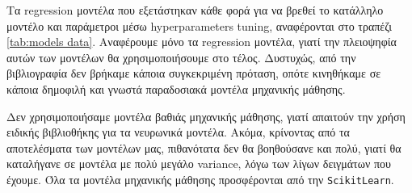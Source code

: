 Τα regression μοντέλα που εξετάστηκαν κάθε φορά για να βρεθεί το κατάλληλο μοντέλο και παράμετροι μέσω hyperparameters tuning, αναφέρονται στο τραπέζι \autoref{tab:models data}.
Αναφέρουμε μόνο τα regression μοντέλα, γιατί την πλειοψηφία αυτών των μοντέλων θα χρησιμοποιήσουμε στο τέλος.
Δυστυχώς, από την βιβλιογραφία δεν βρήκαμε κάποια συγκεκριμένη πρόταση, οπότε κινηθήκαμε σε κάποια δημοφιλή και γνωστά παραδοσιακά μοντέλα μηχανικής μάθησης.

Δεν χρησιμοποιήσαμε μοντέλα βαθιάς μηχανικής μάθησης, γιατί απαιτούν την χρήση ειδικής βιβλιοθήκης για τα νευρωνικά μοντέλα.
Ακόμα, κρίνοντας από τα αποτελέσματα των μοντέλων μας, πιθανότατα δεν θα βοηθούσανε και πολύ, γιατί θα καταλήγανε σε μοντέλα με πολύ μεγάλο variance, λόγω των λίγων δειγμάτων που έχουμε.
Όλα τα μοντέλα μηχανικής μάθησης προσφέρονται από την \texttt{Scikit\-Learn}.

\setlength{\tabcolsep}{4pt}

